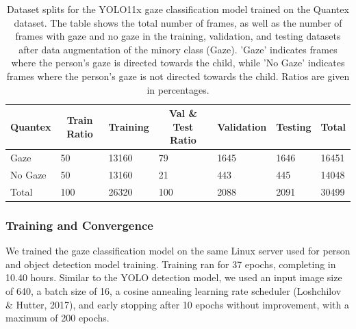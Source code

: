 \documentclass[
  man,floatsintext]{apa6}
\begin{document}
\begin{table}[tbp]

\begin{center}
\begin{threeparttable}

\caption{\label{tab:gaze-dataset-splits}Dataset splits for the YOLO11x gaze classification model trained on the Quantex dataset. The table shows the total number of frames, as well as the number of frames with gaze and no gaze in the training, validation, and testing datasets after data augmentation of the minory class (Gaze). 'Gaze' indicates frames where the person's gaze is directed towards the child, while 'No Gaze' indicates frames where the person's gaze is not directed towards the child. Ratios are given in percentages.}

\begin{tabular}{lllllll}
\toprule
Quantex & \multicolumn{1}{c}{Train Ratio} & \multicolumn{1}{c}{Training} & \multicolumn{1}{c}{Val \& Test Ratio} & \multicolumn{1}{c}{Validation} & \multicolumn{1}{c}{Testing} & \multicolumn{1}{c}{Total}\\
\midrule
Gaze & 50 & 13160 & 79 & 1645 & 1646 & 16451\\
No Gaze & 50 & 13160 & 21 & 443 & 445 & 14048\\
Total & 100 & 26320 & 100 & 2088 & 2091 & 30499\\
\bottomrule
\end{tabular}

\end{threeparttable}
\end{center}

\end{table}

\subsubsection{Training and Convergence}\label{training-and-convergence-1}

We trained the gaze classification model on the same Linux server used for person and object detection model training. Training ran for 37 epochs, completing in 10.40 hours. Similar to the YOLO detection model, we used an input image size of 640, a batch size of 16, a cosine annealing learning rate scheduler (Loshchilov \& Hutter, 2017), and early stopping after 10 epochs without improvement, with a maximum of 200 epochs.
\end{document}
